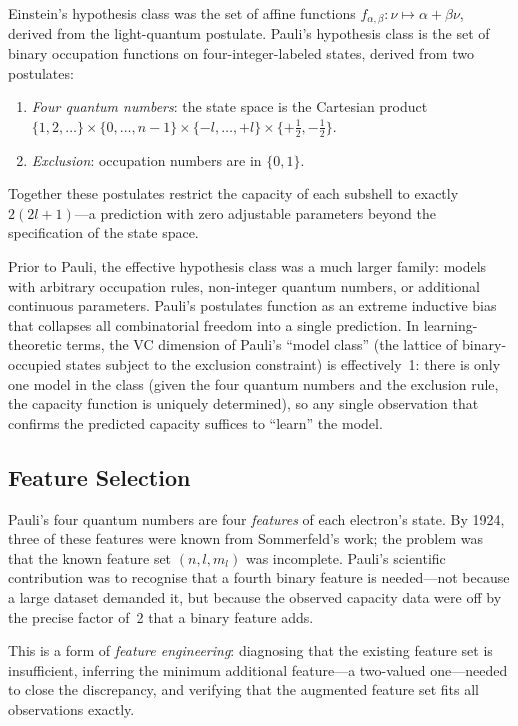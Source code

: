 \documentclass[12pt]{article}
\begin{document}
Einstein's hypothesis class was the set of affine functions
$f_{\alpha,\beta}:\nu\mapsto\alpha+\beta\nu$, derived from the light-quantum
postulate.  Pauli's hypothesis class is the set of binary occupation functions
on four-integer-labeled states, derived from two postulates:
\begin{enumerate}
  \item \emph{Four quantum numbers}: the state space is the Cartesian product
    $\{1,2,\ldots\}\times\{0,\ldots,n-1\}\times\{-l,\ldots,+l\}\times
    \{+\tfrac{1}{2},-\tfrac{1}{2}\}$.
  \item \emph{Exclusion}: occupation numbers are in $\{0,1\}$.
\end{enumerate}
Together these postulates restrict the capacity of each subshell to exactly
$2(2l+1)$---a prediction with zero adjustable parameters beyond the
specification of the state space.

Prior to Pauli, the effective hypothesis class was a much larger family: models
with arbitrary occupation rules, non-integer quantum numbers, or additional
continuous parameters.  Pauli's postulates function as an extreme inductive
bias that collapses all combinatorial freedom into a single prediction.  In
learning-theoretic terms, the VC dimension of Pauli's ``model class'' (the
lattice of binary-occupied states subject to the exclusion constraint) is
effectively~1: there is only one model in the class (given the four quantum
numbers and the exclusion rule, the capacity function is uniquely determined),
so any single observation that confirms the predicted capacity suffices to
``learn'' the model.

\subsection{Feature Selection}

Pauli's four quantum numbers are four \emph{features} of each electron's
state.  By 1924, three of these features were known from Sommerfeld's work;
the problem was that the known feature set $(n, l, m_l)$ was incomplete.
Pauli's scientific contribution was to recognise that a fourth binary feature
is needed---not because a large dataset demanded it, but because the observed
capacity data were off by the precise factor of~2 that a binary feature adds.

This is a form of \emph{feature engineering}: diagnosing that the existing
feature set is insufficient, inferring the minimum additional feature---a
two-valued one---needed to close the discrepancy, and verifying that the
augmented feature set fits all observations exactly.
\end{document}
